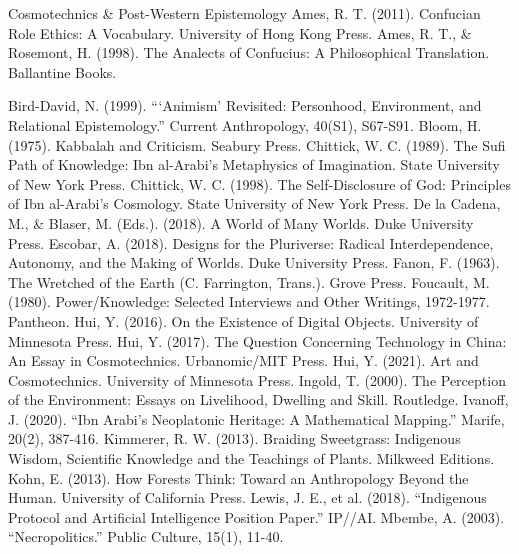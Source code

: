 \documentclass[11pt,a4paper,openany]{book}
\begin{document}
Cosmotechnics \& Post-Western Epistemology Ames, R. T. (2011). Confucian Role Ethics: A Vocabulary. University of Hong Kong Press. Ames, R. T., \& Rosemont, H. (1998). The Analects of Confucius: A Philosophical Translation. Ballantine Books.

Bird-David, N. (1999). “‘Animism’ Revisited: Personhood, Environment, and Relational Epistemology.” Current Anthropology, 40(S1), S67-S91. Bloom, H. (1975). Kabbalah and Criticism. Seabury Press. Chittick, W. C. (1989). The Sufi Path of Knowledge: Ibn al-Arabi’s Metaphysics of Imagination. State University of New York Press. Chittick, W. C. (1998). The Self-Disclosure of God: Principles of Ibn al-Arabi’s Cosmology. State University of New York Press. De la Cadena, M., \& Blaser, M. (Eds.). (2018). A World of Many Worlds. Duke University Press. Escobar, A. (2018). Designs for the Pluriverse: Radical Interdependence, Autonomy, and the Making of Worlds. Duke University Press. Fanon, F. (1963). The Wretched of the Earth (C. Farrington, Trans.). Grove Press. Foucault, M. (1980). Power/Knowledge: Selected Interviews and Other Writings, 1972-1977. Pantheon. Hui, Y. (2016). On the Existence of Digital Objects. University of Minnesota Press. Hui, Y. (2017). The Question Concerning Technology in China: An Essay in Cosmotechnics. Urbanomic/MIT Press. Hui, Y. (2021). Art and Cosmotechnics. University of Minnesota Press. Ingold, T. (2000). The Perception of the Environment: Essays on Livelihood, Dwelling and Skill. Routledge. Ivanoff, J. (2020). “Ibn Arabi’s Neoplatonic Heritage: A Mathematical Mapping.” Marife, 20(2), 387-416. Kimmerer, R. W. (2013). Braiding Sweetgrass: Indigenous Wisdom, Scientific Knowledge and the Teachings of Plants. Milkweed Editions. Kohn, E. (2013). How Forests Think: Toward an Anthropology Beyond the Human. University of California Press. Lewis, J. E., et al. (2018). “Indigenous Protocol and Artificial Intelligence Position Paper.” IP//AI. Mbembe, A. (2003). “Necropolitics.” Public Culture, 15(1), 11-40.
\end{document}
